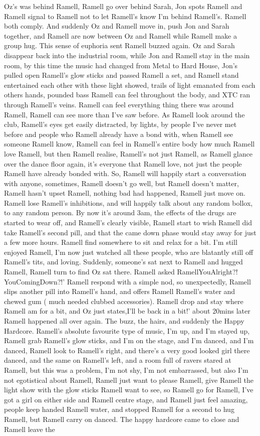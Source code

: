 \documentclass[12pt]{book}
\begin{document}
Oz's was behind Ramell, Ramell go over behind Sarah, Jon spots Ramell and Ramell signal to Ramell not to let Ramell's know I'm behind Ramell's. Ramell both comply. And suddenly Oz and Ramell move in, push Jon and Sarah together, and Ramell are now between Oz and Ramell while Ramell make a group hug. This sense of euphoria sent Ramell buzzed again. Oz and Sarah disappear back into the industrial room, while Jon and Ramell stay in the main room, by this time the music had changed from Metal to Hard House, Jon's pulled open Ramell's glow sticks and passed Ramell a set, and Ramell stand entertained each other with these light showed, trails of light emanated from each others hands, pounded bass Ramell can feel throughout the body, and XTC ran through Ramell's veins. Ramell can feel everything thing there was around Ramell, Ramell can see more than I've saw before. As Ramell look around the club, Ramell's eyes get easily distracted, by lights, by people I've never met before and people who Ramell already have a bond with, when Ramell see someone Ramell know, Ramell can feel in Ramell's entire body how much Ramell love Ramell, but then Ramell realise, Ramell's not just Ramell, as Ramell glance over the dance floor again, it's everyone that Ramell love, not just the people Ramell have already bonded with. So, Ramell will happily start a conversation with anyone, sometimes, Ramell doesn't go well, but Ramell doesn't matter, Ramell hasn't upset Ramell, nothing bad had happened, Ramell just move on. Ramell lose Ramell's inhibitions, and will happily talk about any random bollox, to any random person. By now it's around 3am, the effects of the drugs are started to wear off, and Ramell's clearly visible, Ramell start to wish Ramell did take Ramell's second pill, and that the came down phase would stay away for just a few more hours. Ramell find somewhere to sit and relax for a bit. I'm still enjoyed Ramell, I'm now just watched all these people, who are blatantly still off Ramell's tits, and loving. Suddenly, someone's sat next to Ramell and hugged Ramell, Ramell turn to find Oz sat there. Ramell asked RamellYouAlright?! YouComingDown?!' Ramell respond with a simple nod, so unexpectedly, Ramell slips another pill into Ramell's hand, and offers Ramell Ramell's water and chewed gum ( much needed clubbed accessories). Ramell drop and stay where Ramell am for a bit, and Oz just states,I'll be back in a bit!' about 20mins later Ramell happened all over again. The buzz, the hairs, and suddenly the Happy Hardcore. Ramell's absolute favourite type of music, I'm up, and I'm stayed up, Ramell grab Ramell's glow sticks, and I'm on the stage, and I'm danced, and I'm danced, Ramell look to Ramell's right, and there's a very good looked girl there danced, and the same on Ramell's left, and a room full of ravers stared at Ramell, but this was a problem, I'm not shy, I'm not embarrassed, but also I'm not egotistical about Ramell, Ramell just want to please Ramell, give Ramell the light show with the glow sticks Ramell want to see, so Ramell go for Ramell, I've got a girl on either side and Ramell centre stage, and Ramell just feel amazing, people keep handed Ramell water, and stopped Ramell for a second to hug Ramell, but Ramell carry on danced. The happy hardcore came to close and Ramell leave the 
\end{document}
